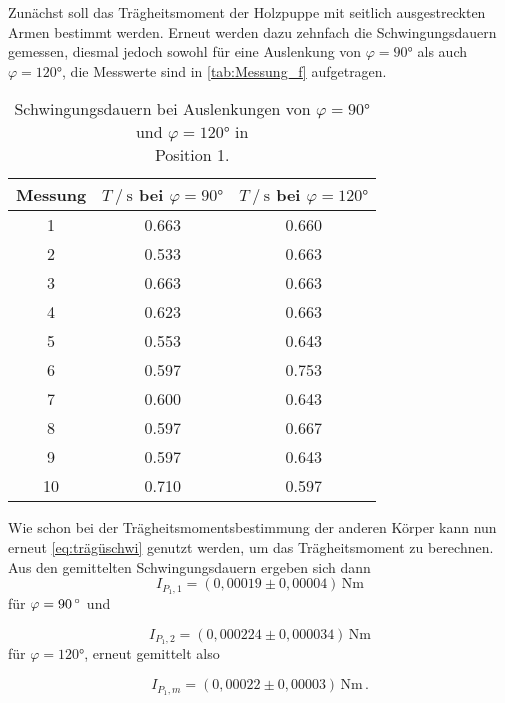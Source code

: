 Zunächst soll das Trägheitsmoment der Holzpuppe mit seitlich ausgestreckten Armen bestimmt werden.
Erneut werden dazu zehnfach die Schwingungsdauern gemessen, diesmal jedoch sowohl für eine Auslenkung von $\varphi = 90 \unit{\degree}$ als auch $\varphi = 120 \unit{\degree}$,
die Messwerte sind in \autoref{tab:Messung_f} aufgetragen.

\begin{table}[H]
  \centering
  \begin{tabular}{S[table-format=2.0] S[table-format=1.3] S}
      \toprule
      {Messung} & {$T \mathbin{/} \unit{\second}$ bei $\varphi = 90 \unit{\degree}$} & {$T \mathbin{/} \unit{\second}$ bei $\varphi = 120 \unit{\degree}$}\\
       & 0.663 & 0.660 \\
      2 & 0.533 & 0.663 \\
      3 & 0.663 & 0.663 \\
      4 & 0.623 & 0.663 \\
      5 & 0.553 & 0.643 \\
      6 & 0.597 & 0.753 \\
      7 & 0.600 & 0.643 \\
      8 & 0.597 & 0.667 \\
      9 & 0.597 & 0.643 \\
      10& 0.710 & 0.597 \\
      \bottomrule
  \end{tabular}
  \caption{Schwingungsdauern bei Auslenkungen von $\varphi = 90 \unit{\degree}$ und $\varphi = 120 \unit{\degree}$ in \\ Position 1.}
  \label{tab:Messung_f}
\end{table}

Wie schon bei der Trägheitsmomentsbestimmung der anderen Körper kann nun erneut \eqref{eq:trägüschwi} genutzt werden, um das Trägheitsmoment zu berechnen.
Aus den gemittelten Schwingungsdauern ergeben sich dann
\begin{equation*}
  I_{P_1,1} = (0,00019 \pm 0,00004) \, \unit{\newton\meter} 
\end{equation*} 
für $\varphi = 90 \, \unit{{\degree}}$ und

\begin{equation*}
  I_{P_1,2} = (0,000224 \pm 0,000034) \, \unit{\newton\meter} 
\end{equation*}
für $\varphi = 120 \unit{\degree}$, erneut gemittelt also

\begin{equation*}
  I_{P_1,m} = (0,00022 \pm 0,00003) \, \unit{\newton\meter} \,.
\end{equation*}

